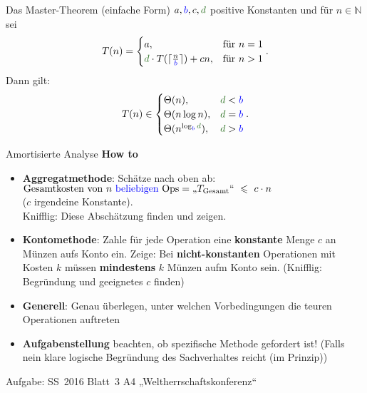 \begin{frame}{Das Master-Theorem (einfache Form)}
	$a, \textcolor{blue}{b}, c, \textcolor{darkgreen}{d}$ positive Konstanten und für $n \in \mathbb{N}$ sei 
	\[
	T(n) = 
	\begin{cases}
	a,  & \text{für } n = 1 \\
	\textcolor{darkgreen}{d} \cdot T(\lceil \frac{n}{\textcolor{blue}{b}} \rceil) + cn, & \text{für } n > 1
	\end{cases}.
	\]
	Dann gilt:
	\[
	T(n) \in 
	\begin{cases}
	\Theta(n),                                                        & \textcolor{darkgreen}{d} < \textcolor{blue}{b} \\
	\Theta(n \log n),                                                 & \textcolor{darkgreen}{d} = \textcolor{blue}{b} \\
	\Theta(n^{\log _{\textcolor{blue}{b}} \textcolor{darkgreen}{d}}), & \textcolor{darkgreen}{d} > \textcolor{blue}{b}
	\end{cases}.
	\] 
\end{frame}





\begin{frame}{Amortisierte Analyse}
	\textbf{How to} \\
	\begin{itemize}
		\item \textbf{Aggregatmethode}: Schätze nach oben ab: \\
		\qquad $
		\text{Gesamtkosten von $n$ \textcolor{blue}{beliebigen} Ops} = \text{„}T_\text{Gesamt}\text{“} \ \leq \ c \cdot n 
		$ \\
		($c$ irgendeine Konstante). \\ 
		Knifflig: Diese Abschätzung finden und zeigen. 
		\item \textbf{Kontomethode}: Zahle für jede Operation eine \textbf{konstante} Menge $c$ an Münzen aufs Konto ein. Zeige: Bei \textbf{nicht-konstanten} Operationen mit Kosten $k$ müssen \textbf{mindestens} $k$ Münzen aufm Konto sein.
		(Knifflig: Begründung und geeignetes $c$ finden)
		\item \textbf{Generell}: Genau überlegen, unter welchen Vorbedingungen die teuren Operationen auftreten
		\item \textbf{Aufgabenstellung} beachten, ob spezifische Methode gefordert ist! (Falls nein \impl klare logische Begründung des Sachverhaltes reicht (im Prinzip))
	\end{itemize}
	{\small Aufgabe: SS~2016 Blatt~3 A4 „Weltherrschaftskonferenz“}
\end{frame}





